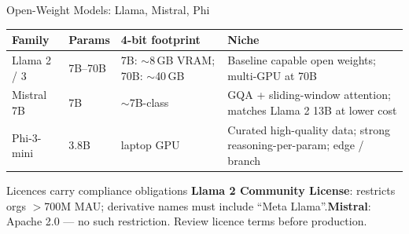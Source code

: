 \documentclass[9pt,t]{beamer}
\begin{document}
\begin{frame}{Open-Weight Models: Llama, Mistral, Phi}
\small
\begin{tabular}{p{2.1cm}p{1.5cm}p{2.4cm}p{4.0cm}}
\toprule
\textbf{Family} & \textbf{Params} & \textbf{4-bit footprint} & \textbf{Niche} \\
\midrule
Llama 2 / 3 & 7B--70B &
  7B: $\sim$8\,GB VRAM; 70B: $\sim$40\,GB &
  Baseline capable open weights; multi-GPU at 70B \\
\addlinespace
Mistral 7B & 7B &
  $\sim$7B-class &
  GQA + sliding-window attention; matches Llama 2 13B at lower cost \\
\addlinespace
Phi-3-mini & 3.8B & laptop GPU &
  Curated high-quality data; strong reasoning-per-param; edge / branch \\
\bottomrule
\end{tabular}

\medskip
\normalsize
\begin{alertblock}{Licences carry compliance obligations}
\textbf{Llama 2 Community License}: restricts orgs $>$700M MAU; derivative names must
include ``Meta Llama''.\quad\textbf{Mistral}: Apache 2.0 --- no such restriction.
Review licence terms before production.
\end{alertblock}
\end{frame}
\end{document}
